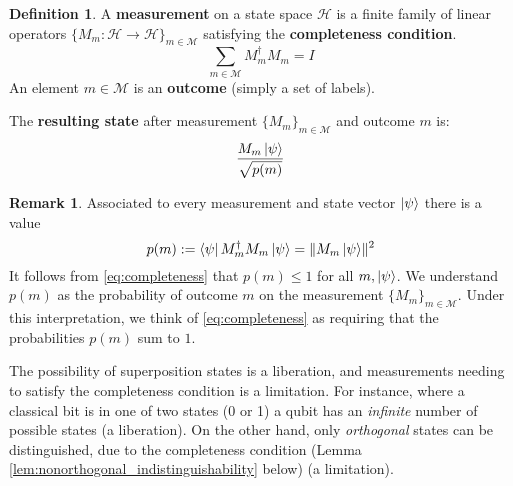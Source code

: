 \documentclass[12pt]{article}
\theoremstyle{plain}
\theoremstyle{definition}
\newtheorem{defn}[thm]{Definition} %
\newtheorem{remark}[thm]{Remark}
\newcommand{\call}[1]{\mathcal{#1}}
\newcommand{\lto}{\longrightarrow}
\begin{document}
\begin{defn}\label{def:measurement}
	A \textbf{measurement} on a state space $\call{H}$ is a finite family of linear operators $\lbrace M_m: \call{H}\lto \call{H}\rbrace_{m \in \call{M}}$ satisfying the \textbf{completeness condition}.
	\begin{equation}\label{eq:completeness}
		\sum_{m \in \call{M}}M_m^{\dagger}M_m = I
	\end{equation}
	An element $m \in \call{M}$ is an \textbf{outcome} (simply a set of labels).
	
	The \textbf{resulting state} after measurement $\{ M_m \}_{m \in \call{M}}$ and outcome $m$ is:
	\begin{equation}
		\frac{M_m\ket{\psi}}{\sqrt{p(m)}}
	\end{equation}
\end{defn}
\begin{remark}
	Associated to every measurement and state vector $\ket{\psi}$ there is a value
	\begin{equation}
		p(m) := \bra{\psi}M^{\dagger}_mM_m\ket{\psi} = \lVert M_m \ket{\psi} \rVert^2
	\end{equation}
	It follows from \eqref{eq:completeness} that $p(m) \leq 1$ for all $m, \ket{\psi}$. We understand $p(m)$ as the probability of outcome $m$ on the measurement $\{ M_m \}_{m \in \call{M}}$. Under this interpretation, we think of \eqref{eq:completeness} as requiring that the probabilities $p(m)$ sum to $1$.
	\end{remark}
	
The possibility of superposition states is a liberation, and measurements needing to satisfy the completeness condition is a limitation. For instance, where a classical bit is in one of two states (0 or 1) a qubit has an \emph{infinite} number of possible states (a liberation). On the other hand, only \emph{orthogonal} states can be distinguished, due to the completeness condition (Lemma \ref{lem:nonorthogonal_indistinguishability} below) (a limitation).
\end{document}
